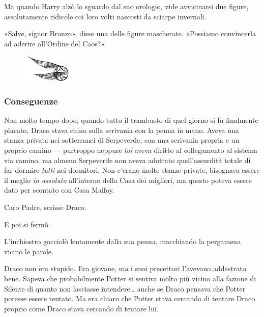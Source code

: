 Ma quando Harry alzò lo sguardo dal suo orologio, vide avvicinarsi due figure, assolutamente ridicole coi loro volti nascosti da sciarpe invernali.

«Salve, signor Bronzo», disse una delle figure mascherate. «Possiamo convincerla ad aderire all’Ordine del Caos?»

\begin{figure}[h]
	\includegraphics[scale=0.4]{boccino.png}
	\centering
\end{figure}

\subsubsection{Conseguenze}

Non molto tempo dopo, quando tutto il trambusto di quel giorno si fu finalmente placato, Draco stava chino sulla scrivania con la penna in mano. Aveva una stanza privata nei sotterranei di Serpeverde, con una scrivania propria e un proprio camino — purtroppo neppure \textit{lui} aveva diritto al collegamento al sistema via camino, ma almeno Serpeverde non aveva adottato quell’assurdità totale di far dormire \textit{tutti} nei dormitori. Non c’erano molte stanze private, bisognava essere il meglio \textit{in assoluto} all’interno della Casa dei migliori, ma questo poteva essere dato per scontato con Casa Malfoy.

\vspace{1em}
\begin{addmargin}[3em]{3em}%
\begin{itpars}
Caro Padre, scrisse Draco.
\end{itpars}
\end{addmargin}
\vspace{1em}

E poi si fermò.

L’inchiostro gocciolò lentamente dalla sua penna, macchiando la pergamena vicino le parole.

Draco non era stupido. Era giovane, ma i suoi precettori l’avevano addestrato bene. Sapeva che probabilmente Potter si sentiva molto più vicino alla fazione di Silente di quanto non lasciasse intendere… anche se Draco pensava che Potter potesse essere tentato. Ma era chiaro che Potter stava cercando di tentare Draco proprio come Draco stava cercando di tentare lui.

